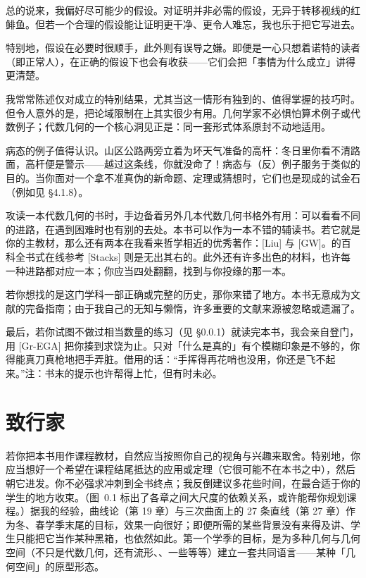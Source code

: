总的说来，我偏好尽可能少的假设。对证明并非必需的假设，无异于转移视线的红鲱鱼。但若一个合理的假设能让证明更干净、更令人难忘，我也乐于把它写进去。

特别地，\trNoetherian{}假设在必要时很顺手，此外则有误导之嫌。即便是一心只想着诺特的读者（即正常人），在正确的假设下也会有收获——它们会把「事情为什么成立」讲得更清楚。

我常常陈述仅对\trVariety{}成立的特别结果，尤其当这一情形有独到的、值得掌握的技巧时。但令人意外的是，把论域限制在\trAlgClosedField{}上其实很少有用。几何学家不必惧怕算术例子或代数例子；代数几何的一个核心洞见正是：同一套形式体系原封不动地适用。

病态的例子值得认识。山区公路两旁立着为坏天气准备的高杆：冬日里你看不清路面，高杆便是警示——越过这条线，你就没命了！病态与（反）例子服务于类似的目的。当你面对一个拿不准真伪的新命题、定理或猜想时，它们也是现成的试金石（例如见 \S4.1.8）。

攻读一本代数几何的书时，手边备着另外几本代数几何书格外有用：可以看看不同的进路，在遇到困难时也有别的去处。本书可以作为一本不错的辅读书。若它就是你的主教材，那么还有两本在我看来哲学相近的优秀著作：[Liu] 与 [GW]。\trDeJong{}的百科全书式在线参考 [Stacks] 则是无出其右的。此外还有许多出色的材料，也许每一种进路都对应一本；你应当四处翻翻，找到与你投缘的那一本。

若你想找的是这门学科一部正确或完整的历史，那你来错了地方。本书无意成为文献的完备指南；由于我自己的无知与懒惰，许多重要的文献来源被忽略或遗漏了。

最后，若你试图不做过相当数量的练习（见 \S0.0.1）就读完本书，我会亲自登门，用 [Gr-EGA] 把你揍到求饶为止。只对「什么是真的」有个模糊印象是不够的，你得能真刀真枪地把手弄脏。借用\trKisin{}的话：“手挥得再花哨也没用，你还是飞不起来。”注：书末的提示也许帮得上忙，但有时未必。

\section{致行家}

若你把本书用作课程教材，自然应当按照你自己的视角与兴趣来取舍。特别地，你应当想好一个希望在课程结尾抵达的应用或定理（它很可能不在本书之中），然后朝它进发。你不必强求冲刺到全书终点；我反倒建议多花些时间，在最合适于你的学生的地方收束。（图~0.1 标出了各章之间大尺度的依赖关系，或许能帮你规划课程。）据我的经验，曲线论（第 19 章）与三次曲面上的 27 条直线（第 27 章）作为冬、春学季末尾的目标，效果一向很好；即便所需的某些背景没有来得及讲、学生只能把它当作某种黑箱，也依然如此。第一个学季的目标，是为多种几何与几何空间（不只是代数几何，还有流形、\trComplexGeometry、一些\trDifferentialGeometry{}等等）建立一套共同语言——某种「几何空间」的原型形态。

